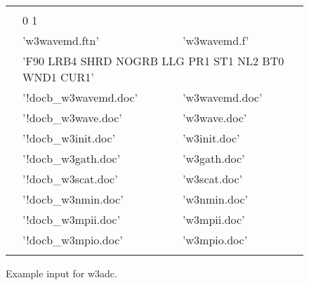 \setlength{\unitlength}{0.1mm}

\begin{figure}

\begin{center} {\code \begin{tabular}{|cllc|} \hline
 & & &  \\
 & \multicolumn{2}{l}{0 1}        & \\ 
 & 'w3wavemd.ftn' & 'w3wavemd.f'  & \\
 & \multicolumn{2}{l}{'F90 LRB4 SHRD NOGRB LLG PR1 ST1 NL2 BT0 WND1 CUR1'}& \\
 & '!docb\_w3wavemd.doc' & 'w3wavemd.doc'  & \\
 & '!docb\_w3wave.doc'   & 'w3wave.doc'    & \\
 & '!docb\_w3init.doc'   & 'w3init.doc'    & \\
 & '!docb\_w3gath.doc'   & 'w3gath.doc'    & \\
 & '!docb\_w3scat.doc'   & 'w3scat.doc'    & \\
 & '!docb\_w3nmin.doc'   & 'w3nmin.doc'    & \\
 & '!docb\_w3mpii.doc'   & 'w3mpii.doc'    & \\
 & '!docb\_w3mpio.doc'   & 'w3mpio.doc'    & \\
&               &             & \\ \hline
\end{tabular} } \end{center} 
\caption{Example input for {\F w3adc}.} \label{fig:w3adc}

\botline
\end{figure}
